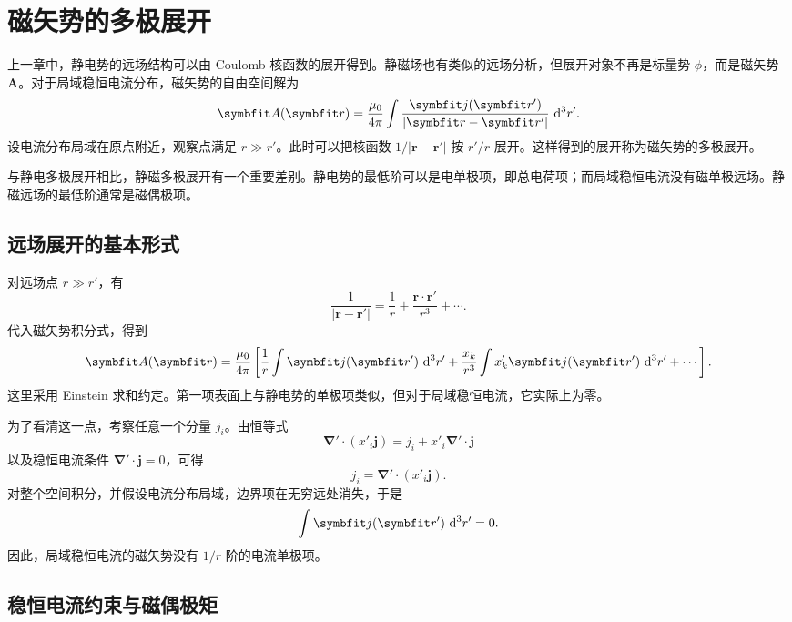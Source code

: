 \section{磁矢势的多极展开}

上一章中，静电势的远场结构可以由 Coulomb 核函数的展开得到。静磁场也有类似的远场分析，但展开对象不再是标量势 $\phi$，而是磁矢势 $\bm{A}$。对于局域稳恒电流分布，磁矢势的自由空间解为
\[
\bm{A}(\bm{r})
=
\frac{\mu_{0}}{4\pi}
\int
\frac{\bm{j}(\bm{r}')}{|\bm{r}-\bm{r}'|}
\,\dif^{3}r'.
\]
设电流分布局域在原点附近，观察点满足 $r\gg r'$。此时可以把核函数 $1/|\bm{r}-\bm{r}'|$ 按 $r'/r$ 展开。这样得到的展开称为磁矢势的多极展开。

与静电多极展开相比，静磁多极展开有一个重要差别。静电势的最低阶可以是电单极项，即总电荷项；而局域稳恒电流没有磁单极远场。静磁远场的最低阶通常是磁偶极项。

\subsection{远场展开的基本形式}

对远场点 $r\gg r'$，有
\[
\frac{1}{|\bm{r}-\bm{r}'|}
=
\frac{1}{r}
+
\frac{\bm{r}\cdot\bm{r}'}{r^{3}}
+\cdots.
\]
代入磁矢势积分式，得到
\[
\bm{A}(\bm{r})
=
\frac{\mu_{0}}{4\pi}
\left[
\frac{1}{r}
\int
\bm{j}(\bm{r}')
\,\dif^{3}r'
+
\frac{x_{k}}{r^{3}}
\int
x'_{k}
\bm{j}(\bm{r}')
\,\dif^{3}r'
+\cdots
\right].
\]
这里采用 Einstein 求和约定。第一项表面上与静电势的单极项类似，但对于局域稳恒电流，它实际上为零。

为了看清这一点，考察任意一个分量 $j_i$。由恒等式
\[
\bm{\nabla}'\cdot(x'_i\bm{j})
=
j_i
+
x'_i\bm{\nabla}'\cdot\bm{j}
\]
以及稳恒电流条件 $\bm{\nabla}'\cdot\bm{j}=0$，可得
\[
j_i
=
\bm{\nabla}'\cdot(x'_i\bm{j}).
\]
对整个空间积分，并假设电流分布局域，边界项在无穷远处消失，于是
\begin{equation}
	\int
	\bm{j}(\bm{r}')
	\,\dif^{3}r'
	=
	0.
	\label{eq:11:current-monopole-vanishes}
\end{equation}
因此，局域稳恒电流的磁矢势没有 $1/r$ 阶的电流单极项。

\subsection{稳恒电流约束与磁偶极矩}


